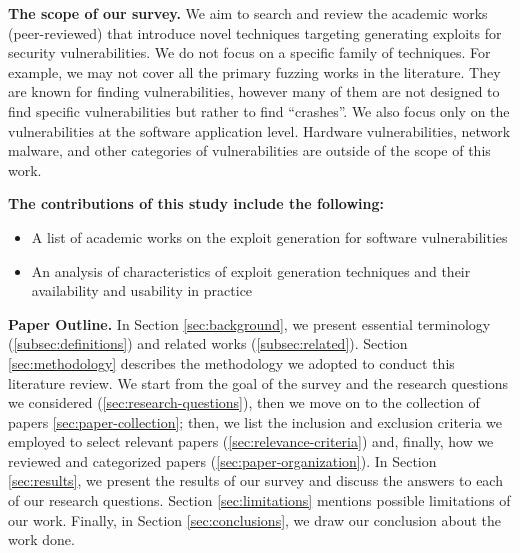 \textbf{The scope of our survey.} We aim to search and review the academic works (peer-reviewed) that introduce novel techniques targeting generating exploits for security vulnerabilities. We do not focus on a specific family of techniques. For example, we may not cover all the primary fuzzing works in the literature. They are known for finding vulnerabilities, however many of them are not designed to find specific vulnerabilities but rather to find ``crashes''. We also focus only on the vulnerabilities at the software application level. Hardware vulnerabilities, network malware, and other categories of vulnerabilities are outside of the scope of this work.

\textbf{The contributions of this study include the following:}
\begin{itemize}
	\item A list of academic works on the exploit generation for software vulnerabilities
    \item An analysis of characteristics of exploit generation techniques and their availability and usability in practice
\end{itemize}

\textbf{Paper Outline.}
In Section \ref{sec:background}, we present essential terminology (\ref{subsec:definitions}) and related works (\ref{subsec:related}). 
Section \ref{sec:methodology} describes the methodology we adopted to conduct this literature review. 
We start from the goal of the survey and the research questions we considered (\ref{sec:research-questions}), then we move on to the collection of papers \ref{sec:paper-collection}; 
then, we list the inclusion and exclusion criteria we employed to select relevant papers (\ref{sec:relevance-criteria}) and, finally, how we reviewed and categorized papers (\ref{sec:paper-organization}).
In Section \ref{sec:results}, we present the results of our survey and discuss the answers to each of our research questions.
Section \ref{sec:limitations} mentions possible limitations of our work.
Finally, in Section \ref{sec:conclusions}, we draw our conclusion about the work done.